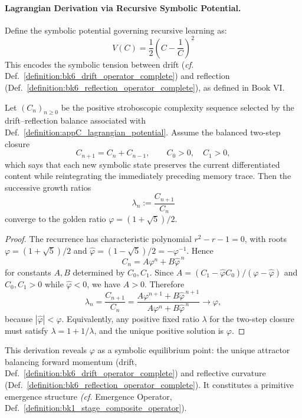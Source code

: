 \paragraph{Lagrangian Derivation via Recursive Symbolic Potential.}
\label{para:appC_phi_lagrangian_derivation}

\begin{definition}
\label{definition:appC_lagrangian_potential}
Define the symbolic potential governing recursive learning as:
\[
V(C) = \frac{1}{2} \left(C - \frac{1}{C} \right)^2
\]
This encodes the symbolic tension between drift (\textit{cf.} Def.~\ref{definition:bk6_drift_operator_complete}) and reflection (Def.~\ref{definition:bk6_reflection_operator_complete}), as defined in Book VI.
\end{definition}

\begin{theorem}
\label{theorem:appC_phi_from_lagrangian}
Let $(C_n)_{n\ge0}$ be the positive stroboscopic complexity sequence selected by
the drift--reflection balance associated with
Def.~\ref{definition:appC_lagrangian_potential}. Assume the balanced two-step
closure
\[
C_{n+1}=C_n+C_{n-1},\qquad C_0>0,\quad C_1>0,
\]
which says that each new symbolic state preserves the current differentiated
content while reintegrating the immediately preceding memory trace. Then the
successive growth ratios
\[
\lambda_n:=\frac{C_{n+1}}{C_n}
\]
converge to the golden ratio
$\varphi=(1+\sqrt5)/2$.
\end{theorem}

\begin{proof}
\label{proof:appC_phi_from_lagrangian}
The recurrence has characteristic polynomial $r^2-r-1=0$, with roots
$\varphi=(1+\sqrt5)/2$ and $\widehat\varphi=(1-\sqrt5)/2=-\varphi^{-1}$. Hence
\[
C_n=A\varphi^n+B\widehat\varphi^{\,n}
\]
for constants $A,B$ determined by $C_0,C_1$. Since
$A=(C_1-\widehat\varphi C_0)/(\varphi-\widehat\varphi)$ and
$C_0,C_1>0$ while $\widehat\varphi<0$, we have $A>0$. Therefore
\[
\lambda_n=\frac{C_{n+1}}{C_n}
=\frac{A\varphi^{n+1}+B\widehat\varphi^{\,n+1}}
       {A\varphi^n+B\widehat\varphi^{\,n}}
\longrightarrow \varphi,
\]
because $|\widehat\varphi|<\varphi$. Equivalently, any positive fixed ratio
$\lambda$ for the two-step closure must satisfy
$\lambda=1+1/\lambda$, and the unique positive solution is $\varphi$.
\end{proof}

\begin{scholium}
This derivation reveals $\varphi$ as a symbolic equilibrium point: the unique attractor balancing forward momentum (drift, Def.~\ref{definition:bk6_drift_operator_complete}) and reflective curvature (Def.~\ref{definition:bk6_reflection_operator_complete}). It constitutes a primitive emergence structure \textit{(cf.} Emergence Operator, Def.~\ref{definition:bk1_stage_composite_operator}).
\end{scholium}

